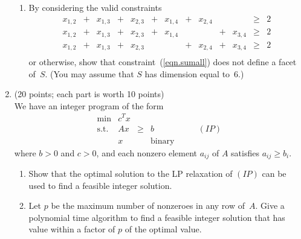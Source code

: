 \documentclass[12pt]{article}
\newcommand{\xab}{\mbox{$x_{1,2}$}}
\newcommand{\xac}{\mbox{$x_{1,3}$}}
\newcommand{\xad}{\mbox{$x_{1,4}$}}
\newcommand{\xbc}{\mbox{$x_{2,3}$}}
\newcommand{\xbd}{\mbox{$x_{2,4}$}}
\newcommand{\xcd}{\mbox{$x_{3,4}$}}
\begin{document}
\begin{enumerate}
\begin{enumerate}
        
         \item
          By considering the valid constraints
          \begin{displaymath}
          \begin{array}{rcrcrcrcrcrcl}
          \xab & + & \xac & + & \xbc & + & \xad & + & \xbd &&& \geq & 2  \\
          \xab & + & \xac & + & \xbc & + & \xad &&& + & \xcd & \geq & 2  \\
          \xab & + & \xac & + & \xbc &&& + & \xbd & + & \xcd & \geq & 2  \\
          \end{array}
          \end{displaymath}
          or otherwise,
          show that constraint~(\ref{eqn.sumall}) does not define a facet
          of~$S$.
          (You may assume that $S$ has dimension equal to~6.)
       \end{enumerate}


   \item (20 points; each part is worth 10 points)  \\
   We have an integer program of the form
   \begin{displaymath}
   \begin{array}{lrclr}
   \min & c^Tx \\
   \mbox{s.t.} & Ax & \geq & b & \qquad (IP)  \\
   & x && \mbox{binary}
   \end{array}
   \end{displaymath}
   where $b>0$ and $c>0$, and each nonzero element $a_{ij}$ of $A$ satisfies
   $a_{ij} \geq b_i$.
         \begin{enumerate}
           \item
           Show that the optimal solution to the LP relaxation of $(IP)$
           can be used to find a feasible integer solution.
         
        
            \item
           Let $p$ be the maximum number of nonzeroes in any row of~$A$.
           Give a polynomial time algorithm to find a feasible integer
           solution that has value within a factor of $p$ of the optimal value.
         \end{enumerate}


\end{enumerate}
\end{document}
